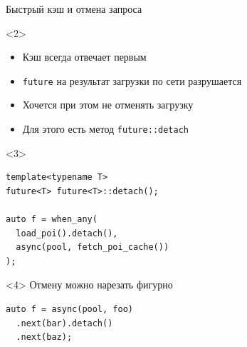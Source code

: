 \documentclass[aspectratio=169,hyperref={unicode},17pt]{beamer}
\begin{document}
\begin{frame}[fragile,t]{Быстрый кэш и отмена запроса}
\begin{onlyenv}<2>
\begin{itemize}
 \item Кэш всегда отвечает первым
 \item \texttt{future} на результат загрузки по сети разрушается
 \item Хочется при этом не отменять загрузку
 \item Для этого есть метод \texttt{future::detach}
\end{itemize}
\end{onlyenv}
\begin{onlyenv}<3>
\begin{lstlisting}[style=cppcode]
template<typename T>
future<T> future<T>::detach();

auto f = when_any(
  load_poi().detach(),
  async(pool, fetch_poi_cache())
);
\end{lstlisting}
\end{onlyenv}
\begin{onlyenv}<4>
Отмену можно нарезать фигурно
\begin{lstlisting}[style=cppcode]
auto f = async(pool, foo)
  .next(bar).detach()
  .next(baz);
\end{lstlisting}
\end{onlyenv}
\end{frame}
\end{document}
